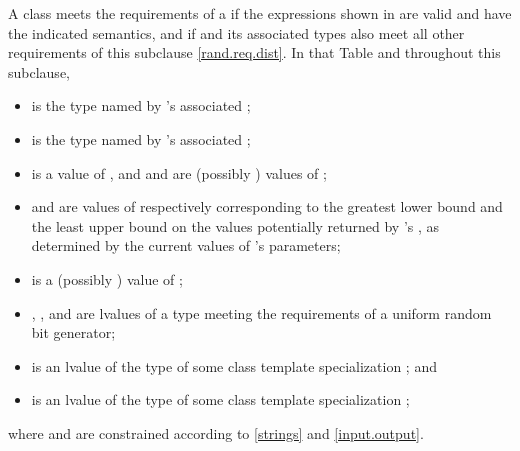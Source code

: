 \pnum
A class 
meets the requirements
of a 
if the expressions shown
in 
are valid and have the indicated semantics,
and if  and its associated types
also meet all other requirements
of this subclause \ref{rand.req.dist}.
In that Table and throughout this subclause,
\begin{itemize}
  \item
     is the type named by
    's associated ;
  \item
     is the type named by
    's associated ;
  \item
     is a
    value of ,
    and
     and  are (possibly ) values of ;
  \item
     and 
    are values of 
    respectively corresponding to
    the greatest lower bound and the least upper bound
    on the values potentially returned by 's ,
    as determined by the current values of 's parameters;
  \item
     is a (possibly ) value of ;
  \item
    , , and  are lvalues of a type
    meeting the requirements
    of a uniform random bit generator;
  \item
     is an lvalue of the type of some class template specialization
     ;
  and
  \item
     is an lvalue of the type of some class template specialization
     ;
\end{itemize}
where  and  are constrained
according to \ref{strings} and \ref{input.output}.

